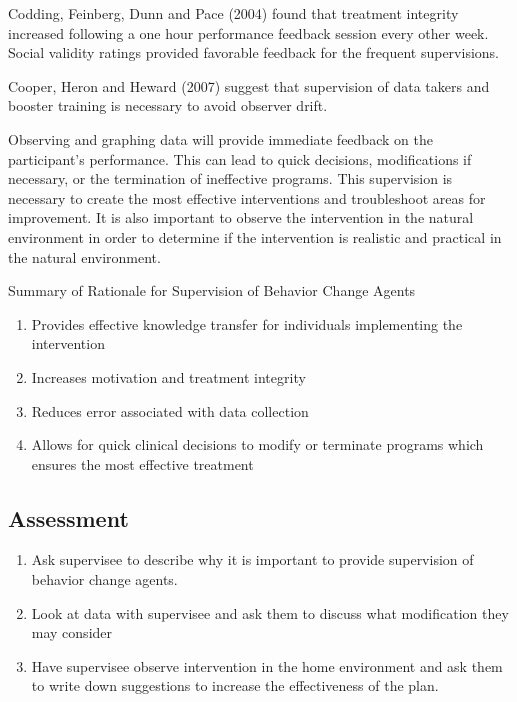 Codding, Feinberg, Dunn and Pace (2004) found that treatment integrity increased following a one hour performance feedback session every other week.  Social validity ratings provided favorable feedback for the frequent supervisions. 

Cooper, Heron and Heward (2007) suggest that supervision of data takers and booster training is necessary to avoid observer drift. 

Observing and graphing data will provide immediate feedback on the participant's performance.  This can lead to quick decisions, modifications if necessary, or the termination of ineffective programs.  This supervision is necessary to create the most effective interventions and troubleshoot areas for improvement. It is also important to observe the intervention in the natural environment in order to determine if the intervention is realistic and practical in the natural environment.

Summary of Rationale for Supervision of Behavior Change Agents
\begin{enumerate}
\item Provides effective knowledge transfer for individuals implementing the intervention
\item Increases motivation and treatment integrity
\item Reduces error associated with data collection
\item Allows for quick clinical decisions to modify or terminate programs which ensures the most effective treatment
\end{enumerate}
%
\subsection{Assessment}
\begin{enumerate}
\item Ask supervisee to describe why it is important to provide supervision of behavior change agents.
\item Look at data with supervisee and ask them to discuss what modification they may consider
\item Have supervisee observe intervention in the home environment and ask them to write down suggestions to increase the effectiveness of the plan.
%
\end{enumerate}
%
